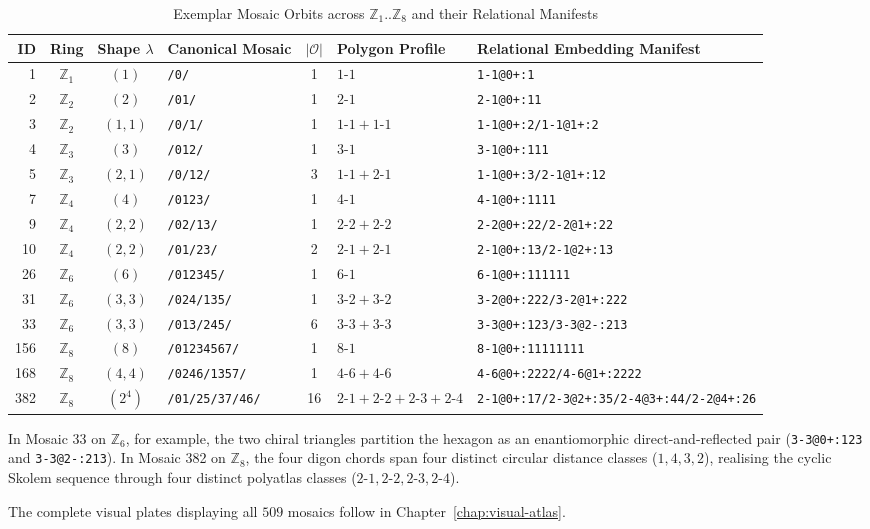 \begin{table}[htbp]
\centering
\footnotesize
\setlength{\tabcolsep}{2.8pt}
\caption{\label{tab:sample-manifests}Exemplar Mosaic Orbits across $\mathbb{Z}_1..\mathbb{Z}_8$ and their Relational Manifests}
\begin{tabular}{r c c l c l l}
\toprule
ID & Ring & Shape $\lambda$ & Canonical Mosaic & $|\mathcal{O}|$ & Polygon Profile & Relational Embedding Manifest \\
\midrule
1 & $\mathbb{Z}_1$ & $(1)$ & \texttt{/0/} & 1 & $1\text{-}1$ & \texttt{1-1@0+:1} \\
2 & $\mathbb{Z}_2$ & $(2)$ & \texttt{/01/} & 1 & $2\text{-}1$ & \texttt{2-1@0+:11} \\
3 & $\mathbb{Z}_2$ & $(1,1)$ & \texttt{/0/1/} & 1 & $1\text{-}1 + 1\text{-}1$ & \texttt{1-1@0+:2/1-1@1+:2} \\
4 & $\mathbb{Z}_3$ & $(3)$ & \texttt{/012/} & 1 & $3\text{-}1$ & \texttt{3-1@0+:111} \\
5 & $\mathbb{Z}_3$ & $(2,1)$ & \texttt{/0/12/} & 3 & $1\text{-}1 + 2\text{-}1$ & \texttt{1-1@0+:3/2-1@1+:12} \\
7 & $\mathbb{Z}_4$ & $(4)$ & \texttt{/0123/} & 1 & $4\text{-}1$ & \texttt{4-1@0+:1111} \\
9 & $\mathbb{Z}_4$ & $(2,2)$ & \texttt{/02/13/} & 1 & $2\text{-}2 + 2\text{-}2$ & \texttt{2-2@0+:22/2-2@1+:22} \\
10 & $\mathbb{Z}_4$ & $(2,2)$ & \texttt{/01/23/} & 2 & $2\text{-}1 + 2\text{-}1$ & \texttt{2-1@0+:13/2-1@2+:13} \\
26 & $\mathbb{Z}_6$ & $(6)$ & \texttt{/012345/} & 1 & $6\text{-}1$ & \texttt{6-1@0+:111111} \\
31 & $\mathbb{Z}_6$ & $(3,3)$ & \texttt{/024/135/} & 1 & $3\text{-}2 + 3\text{-}2$ & \texttt{3-2@0+:222/3-2@1+:222} \\
33 & $\mathbb{Z}_6$ & $(3,3)$ & \texttt{/013/245/} & 6 & $3\text{-}3 + 3\text{-}3$ & \texttt{3-3@0+:123/3-3@2-:213} \\
156 & $\mathbb{Z}_8$ & $(8)$ & \texttt{/01234567/} & 1 & $8\text{-}1$ & \texttt{8-1@0+:11111111} \\
168 & $\mathbb{Z}_8$ & $(4,4)$ & \texttt{/0246/1357/} & 1 & $4\text{-}6 + 4\text{-}6$ & \texttt{4-6@0+:2222/4-6@1+:2222} \\
382 & $\mathbb{Z}_8$ & $(2^4)$ & \texttt{/01/25/37/46/} & 16 & $2\text{-}1{+}2\text{-}2{+}2\text{-}3{+}2\text{-}4$ & \texttt{2-1@0+:17/2-3@2+:35/2-4@3+:44/2-2@4+:26} \\
\bottomrule
\end{tabular}
\end{table}

In Mosaic 33 on $\mathbb{Z}_6$, for example, the two chiral triangles partition the hexagon as an enantiomorphic direct-and-reflected pair (\texttt{3-3@0+:123} and \texttt{3-3@2-:213}). In Mosaic 382 on $\mathbb{Z}_8$, the four digon chords span four distinct circular distance classes ($1, 4, 3, 2$), realising the cyclic Skolem sequence through four distinct polyatlas classes ($2\text{-}1, 2\text{-}2, 2\text{-}3, 2\text{-}4$).

The complete visual plates displaying all $509$ mosaics follow in Chapter~\ref{chap:visual-atlas}.
